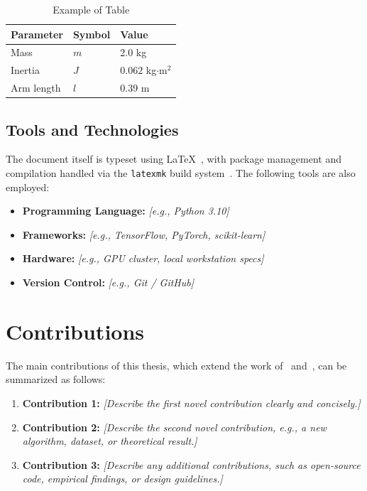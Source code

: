 \begin{table}[h]
\centering
\caption{Example of Table}
\label{tab:robot_params}
\begin{tabular}{lll}
\hline
Parameter & Symbol & Value \\
\hline
Mass & $m$ & 2.0 kg \\
Inertia & $J$ & $0.062$ kg$\cdot$m$^2$ \\
Arm length & $l$ & 0.39 m \\

\hline
\end{tabular}
\end{table}


\subsection{Tools and Technologies}
\label{subsec:tools}

The document itself is typeset using \LaTeX~\cite{lamport1994latex}, with
package management and compilation handled via the \texttt{latexmk} build
system~\cite{mittelbach2004latex}. The following tools are also employed:

\begin{itemize}
    \item \textbf{Programming Language:} \textit{[e.g., Python 3.10]}
    \item \textbf{Frameworks:} \textit{[e.g., TensorFlow, PyTorch, scikit-learn]}
    \item \textbf{Hardware:} \textit{[e.g., GPU cluster, local workstation specs]}
    \item \textbf{Version Control:} \textit{[e.g., Git / GitHub]}
\end{itemize}

\section{Contributions}
\label{sec:contributions}

The main contributions of this thesis, which extend the work
of~\cite{author_method2019} and~\cite{challenge_paper2021}, can be
summarized as follows:

\begin{enumerate}
    \item \textbf{Contribution 1:} \textit{[Describe the first novel contribution
          clearly and concisely.]}
    \item \textbf{Contribution 2:} \textit{[Describe the second novel contribution,
          e.g., a new algorithm, dataset, or theoretical result.]}
    \item \textbf{Contribution 3:} \textit{[Describe any additional contributions,
          such as open-source code, empirical findings, or design guidelines.]}
\end{enumerate}

